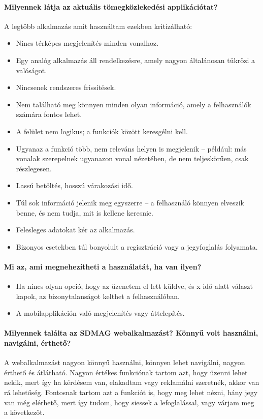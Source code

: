 \paragraph*{Milyennek látja az aktuális tömegközlekedési applikációtat?}
A legtöbb alkalmazás amit használtam ezekben kritizálható:
\begin{itemize}
    \item Nincs térképes megjelenítés minden vonalhoz.
    \item Egy analóg alkalmazás áll rendelkezésre, amely nagyon általánosan tükrözi a valóságot.
    \item Nincsenek rendszeres frissítések.
    \item Nem található meg könnyen minden olyan információ, amely a felhasználók számára fontos lehet.
    \item A felület nem logikus; a funkciók között keresgélni kell.
    \item Ugyanaz a funkció több, nem releváns helyen is megjelenik – például: más vonalak szerepelnek ugyanazon vonal nézetében, de nem teljeskörűen, csak részlegesen.
    \item Lassú betöltés, hosszú várakozási idő.
    \item Túl sok információ jelenik meg egyszerre – a felhasználó könnyen elveszik benne, és nem tudja, mit is kellene keresnie.
    \item Felesleges adatokat kér az alkalmazás.
    \item Bizonyos esetekben túl bonyolult a regisztráció vagy a jegyfoglalás folyamata.
\end{itemize}

\paragraph*{Mi az, ami megnehezítheti a használatát, ha van ilyen?}
\begin{itemize}
    \item Ha nincs olyan opció, hogy az üzenetem el lett küldve, és x idő alatt választ kapok, az bizonytalanságot kelthet a felhasználóban.
    \item A mobilapplikáción való megjelenítés vagy áttelepítés.
\end{itemize}

\paragraph*{Milyennek találta az SDMAG webalkalmazást? Könnyű volt használni, navigálni, érthető?}
 A webalkalmazást nagyon könnyű használni, könnyen lehet navigálni, nagyon érthető és átlátható. Nagyon értékes funkciónak tartom azt, hogy üzenni lehet nekik, mert így ha kérdésem van, elakadtam vagy reklamálni szeretnék, akkor van rá lehetőség. Fontosnak tartom azt a funkciót is, hogy meg lehet nézni, hány jegy van még elérhető, mert így tudom, hogy siessek a lefoglalással, vagy várjam meg a következőt.

